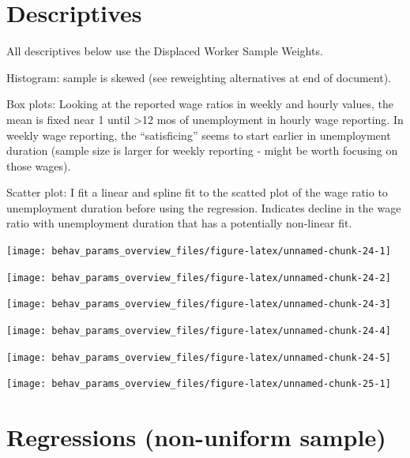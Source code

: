 \documentclass[
]{article}
\begin{document}
\section{Descriptives}\label{descriptives}

All descriptives below use the Displaced Worker Sample Weights.

Histogram: sample is skewed (see reweighting alternatives at end of
document).

Box plots: Looking at the reported wage ratios in weekly and hourly
values, the mean is fixed near 1 until \textgreater12 mos of
unemployment in hourly wage reporting. In weekly wage reporting, the
``satisficing'' seems to start earlier in unemployment duration (sample
size is larger for weekly reporting - might be worth focusing on those
wages).

Scatter plot: I fit a linear and spline fit to the scatted plot of the
wage ratio to unemployment duration before using the regression.
Indicates decline in the wage ratio with unemployment duration that has
a potentially non-linear fit.

\begin{center}\texttt{[image: behav\_params\_overview\_files/figure-latex/unnamed-chunk-24-1]} \end{center}

\begin{center}\texttt{[image: behav\_params\_overview\_files/figure-latex/unnamed-chunk-24-2]} \end{center}

\begin{center}\texttt{[image: behav\_params\_overview\_files/figure-latex/unnamed-chunk-24-3]} \end{center}

\begin{center}\texttt{[image: behav\_params\_overview\_files/figure-latex/unnamed-chunk-24-4]} \end{center}

\begin{center}\texttt{[image: behav\_params\_overview\_files/figure-latex/unnamed-chunk-24-5]} \end{center}

\begin{center}\texttt{[image: behav\_params\_overview\_files/figure-latex/unnamed-chunk-25-1]} \end{center}

\section{Regressions (non-uniform
sample)}\label{regressions-non-uniform-sample}
\end{document}
